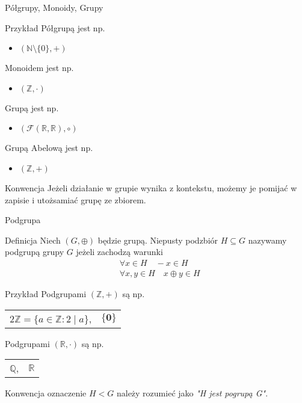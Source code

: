 \documentclass{beamer}
\begin{document}
\begin{frame}{Półgrupy, Monoidy, Grupy}
    \begin{exampleblock}{Przykład}
        Półgrupą jest np.
        \begin{itemize}
            \item $(\mathbb{N}\setminus \{0\} , +)$
        \end{itemize}
        Monoidem jest np. 
        \begin{itemize}
            \item $ ( \mathbb{Z}, \cdot )$
        \end{itemize}
        Grupą jest np.
        \begin{itemize}
            \item $(\mathcal{F}(\mathbb{R},\mathbb{R}), \circ)$
        \end{itemize}
        Grupą Abelową jest np.
        \begin{itemize}
            \item $( \mathbb{Z}, +)$
        \end{itemize}
        
    \end{exampleblock}
    \pause 
    \begin{alertblock}{Konwencja}
        Jeżeli działanie w grupie wynika z kontekstu, możemy je pomijać w zapisie i utożsamiać grupę ze zbiorem.
    \end{alertblock}
\end{frame}

\begin{frame}{Podgrupa}
    \begin{block}{Definicja}
        Niech $(G, \oplus)$ będzie grupą. Niepusty podzbiór $H \subseteq G$ nazywamy podgrupą grupy $G$
        jeżeli zachodzą warunki 
        \begin{align*}
            & \forall  x \in H  \quad -x \in H \\ 
            & \forall x,y \in H  \quad x \oplus y \in H
        \end{align*}
    \end{block}
    \pause 
    \begin{exampleblock}{Przykład}
        Podgrupami  $(\mathbb{Z}, +)$ są np.

        \begin{tabular}{cc}
              $2\mathbb{Z} = \{a \in \mathbb{Z} : 2 \mid a\}$, & 
            $\{ \mathbf{0}\}$
        \end{tabular}

        Podgrupami  $(\mathbb{R}, \cdot)$ są np.
        
        \begin{tabular}{cc}
            $\mathbb{Q}$, & $\mathbb{R}$
        \end{tabular}
    \end{exampleblock}
    \pause 
    \begin{alertblock}{Konwencja}
        oznaczenie $H < G$ należy rozumieć jako \textit{"H jest pogrupą G"}.
    \end{alertblock}
\end{frame}
\end{document}

